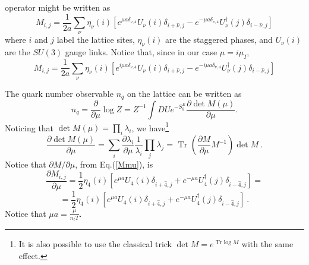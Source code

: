 operator might be written as 
\begin{equation}
\label{Mmu}
 M_{i,j} = \frac{1}{2a} \sum_\nu \eta_\nu(i) \left[ e^{\mu  a  \delta_{\nu,4}} U_\nu(i) 
\delta_{i+\hat{\nu},j} - 
e^{- \mu a \delta_{\nu,4}} U^\dagger_\nu(j)\delta_{i-\hat{\nu},j} \right]
\end{equation}
where $i$ and $j$ label the lattice sites, $\eta_\nu(i)$ are the staggered phases, and 
$U_\nu(i)$ are the $SU(3)$ gauge links.  Notice that, since in our case $\mu = i 
\mu_I$, 
\begin{equation}
 M_{i,j} = \frac{1}{2a} \sum_\nu \eta_\nu(i) \left[ e^{ i \mu a \delta_{\nu,4}} 
U_\nu(i) \delta_{i+\hat{\nu},j} - 
e^{- i \mu a \delta_{\nu,4} } U^\dagger_\nu(j)\delta_{i-\hat{\nu},j} \right]
\end{equation}



The quark number observable $n_q$ on the lattice can be written as 
\begin{equation}
 n_q = \frac{\partial}{\partial \mu} \log Z = Z^{-1} \int DU e^{-S_g^E} 
\frac{\partial \det M(\mu)}{\partial \mu}.
\end{equation}
Noticing that $\det M(\mu) = \prod_i \lambda_i$, we have\footnote{It is also possible 
to use the classical trick $\det M = e^{\mbox{ Tr} \log M}$ with the same effect.}
\begin{equation}
 \frac{\partial \det M (\mu)}{\partial \mu} = \sum_i\frac{\partial 
\lambda_i}{\partial \mu } \frac{1}{\lambda_i} \prod_j \lambda_j  = \mbox{ Tr } \left( 
\frac{\partial M}{\partial \mu}M^{-1}\right) \det M \ .
\end{equation}
Notice that $\partial M / \partial \mu$, from Eq.(\ref{Mmu}), is
\[
  \frac{\partial M_{i,j}}{\partial \mu} = \frac{1}{2}\eta_4(i) \left[ e^{\mu a } 
U_4(i) \delta_{i+\hat{4},j} + 
e^{- \mu a} U^\dagger_4(j)\delta_{i-\hat{4},j} \right] =
\]
\[
= \frac{1}{2} \eta_4(i) \left[ e^{\mu a } 
U_4(i) \delta_{i+\hat{4},j} + 
e^{- \mu a} U^\dagger_4(j)\delta_{i-\hat{4},j} \right] \ . 
\]
Notice that $\mu a = \frac{\mu}{n_t T}$.



 


